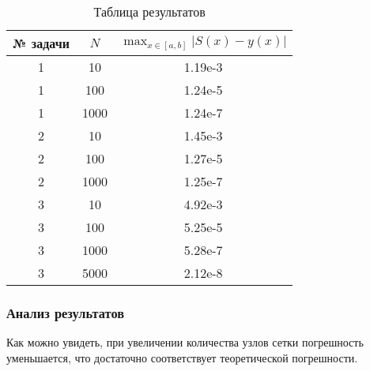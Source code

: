 \begin{table}[H]
\begin{center}
\begin{tabular}{|c|c|c|}
    \hline
    № задачи & \( N \) & \( \max_{x \in [a,b]} \left| S(x) - y(x) \right| \) \\ \hline
    1 & 10 & 1.19e-3 \\ \hline
    1 & 100 & 1.24e-5 \\ \hline
    1 & 1000 & 1.24e-7 \\ \hline
    2 & 10 & 1.45e-3 \\ \hline
    2 & 100 & 1.27e-5 \\ \hline
    2 & 1000 & 1.25e-7 \\ \hline
    3 & 10 & 4.92e-3 \\ \hline
    3 & 100 & 5.25e-5 \\ \hline
    3 & 1000 & 5.28e-7 \\ \hline
    3 & 5000 & 2.12e-8 \\ \hline

\end{tabular}
\caption{Таблица результатов}\label{res-tab}
\end{center}
\end{table}

\subsubsection{Анализ результатов}
    Как можно увидеть, при увеличении количества узлов сетки погрешность уменьшается, что достаточно соответствует теоретической погрешности.